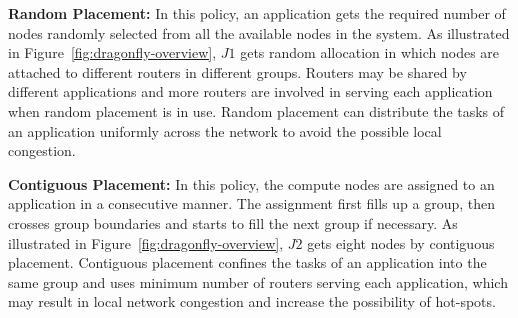\textbf{Random Placement:} In this policy, an application gets the required number of nodes randomly selected from all the available nodes in the system. As illustrated in Figure~\ref{fig:dragonfly-overview}, $J1$ gets random allocation in which nodes are attached to different routers in different groups. Routers may be shared by different applications and more routers are involved in serving each application when random placement is in use. Random placement can distribute the tasks of an application uniformly across the network to avoid the possible local congestion. 



\textbf{Contiguous Placement:} In this policy, the compute nodes are assigned to an application in a consecutive manner. The assignment first fills up a group, then crosses group boundaries and starts to fill the next group if necessary. As illustrated in Figure~\ref{fig:dragonfly-overview}, $J2$ gets eight nodes by contiguous placement. Contiguous placement confines the tasks of an application into the same group and uses minimum number of routers serving each application, which may result in local network congestion and increase the possibility of hot-spots. 

